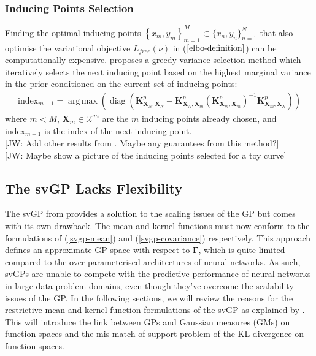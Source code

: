 \documentclass{article}
\newcommand{\jw}[1]{{\color{gray} [JW: #1]}}
\newcommand{\diag}{\operatorname{diag}}
\DeclareMathOperator*{\argmax}{arg\,max}
\numberwithin{equation}{section}
\begin{document}
\subsubsection{Inducing Points Selection}
Finding the optimal inducing points $\left\{x_m, y_m\right\}_{m=1}^{M} \subset \{x_n, y_n\}_{n=1}^{N}$ that also optimise the variational objective $L_{free}(\nu)$ in ($\ref{elbo-definition}$) can be computationally expensive. \cite{burt2020convergence} proposes a greedy variance selection method which iteratively selects the next inducing point based on the highest marginal variance in the prior conditioned on the current set of inducing points:
\begin{align}
    \label{greedy-varaince-selection}
    \text{index}_{m+1} = \argmax \left(\diag \left(\mathbf{K}^p_{\mathbf{X}_N, \mathbf{X}_N} - \mathbf{K}^p_{\mathbf{X}_N, \mathbf{X}_{m}} \left(\mathbf{K}^p_{\mathbf{X}_{m}, \mathbf{X}_{m}}\right)^{-1}\mathbf{K}^p_{\mathbf{X}_{m}, \mathbf{X}_N}\right)\right)
\end{align}
where $m < M$, $\mathbf{X}_{m} \in \mathcal{X}^m$ are the $m$ inducing points already chosen, and $\text{index}_{m+1}$ is the index of the next inducing point.
\\\jw{Add other results from \cite{burt2020convergence}. Maybe any guarantees from this method?}
\\\jw{Maybe show a picture of the inducing points selected for a toy curve}

\subsection{The svGP Lacks Flexibility}\label{section:svgp-problems}
The svGP from \cite{titsias2009variational} provides a solution to the scaling issues of the GP but comes with its own drawback. The mean and kernel functions must now conform to the formulations of (\ref{svgp-mean}) and (\ref{svgp-covariance}) respectively. This approach defines an approximate GP space with respect to $\mathbf{\Gamma}$, which is quite limited compared to the over-parameterised architectures of neural networks. As such, svGPs are unable to compete with the predictive performance of neural networks in large data problem domains, even though they've overcome the scalability issues of the GP. In the following sections, we will review the reasons for the restrictive mean and kernel function formulations of the svGP as explained by \cite{matthews2017scalable}. This will introduce the link between GPs and Gaussian measures (GMs) on function spaces and the mis-match of support problem of the KL divergence on function spaces. 
\end{document}
